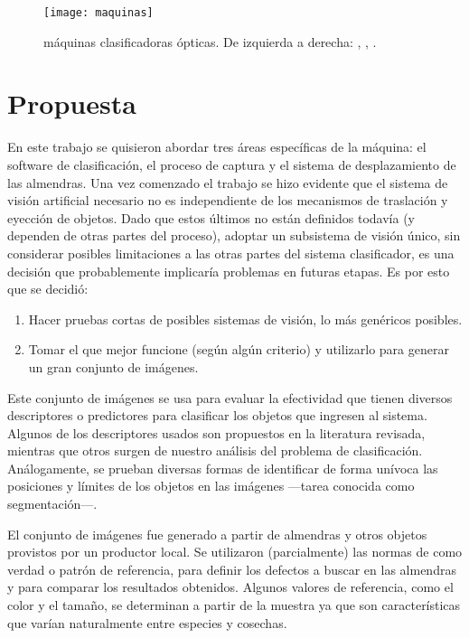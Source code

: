 \begin{figure}[hbtp]
\centering
\texttt{[image: maquinas]}
\caption[Máquinas clasificadoras]{máquinas clasificadoras ópticas. De izquierda a derecha: , , .~\autocite{imagenes:maquinasbuhler,imagenes:maquinastomra}}
\label{fig:maquinas}
\end{figure}



\section{Propuesta}
En este trabajo se quisieron abordar tres áreas específicas de la máquina: el software de clasificación, el proceso de captura y el sistema de desplazamiento de las almendras. Una vez comenzado el trabajo se hizo evidente que el sistema de visión artificial necesario no es independiente de los mecanismos de traslación y eyección de objetos. Dado que estos últimos no están definidos todavía (y dependen de otras partes del proceso), adoptar un subsistema de visión único, sin considerar posibles limitaciones a las otras partes del sistema clasificador, es una decisión que probablemente implicaría problemas en futuras etapas. Es por esto que se decidió:

\begin{enumerate}
\item Hacer pruebas cortas de posibles sistemas de visión, lo más genéricos posibles.
\item Tomar el que mejor funcione (según algún criterio) y utilizarlo para generar un gran conjunto de imágenes.
\end{enumerate}

Este conjunto de imágenes se usa para evaluar la efectividad que tienen diversos descriptores o predictores para clasificar los objetos que ingresen al sistema. Algunos de los descriptores usados son propuestos en la literatura revisada, mientras que otros surgen de nuestro análisis del problema de clasificación. Análogamente, se prueban diversas formas de identificar de forma unívoca las posiciones y límites de los objetos en las imágenes —tarea conocida como segmentación—.

El conjunto de imágenes fue generado a partir de almendras y otros objetos provistos por un productor local. Se utilizaron (parcialmente) las normas de  como verdad o patrón de referencia, para definir los defectos a buscar en las almendras y para comparar los resultados obtenidos. Algunos valores de referencia, como el color y el tamaño, se determinan a partir de la muestra ya que son características que varían naturalmente entre especies y cosechas.




